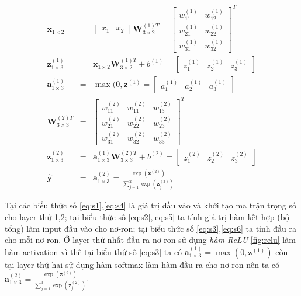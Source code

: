 \begin{eqnarray}
\textbf{x}_{1\times 2} &=&\begin{bmatrix} x_1 &x_2 \end{bmatrix} \textbf{W}^{(1)T}_{3{\times}2}  =\begin{bmatrix}
	w^{(1)}_{11} &w^{(1)}_{12} \\[6pt]
	w^{(1)}_{21} &w^{(1)}_{22} \\[6pt]
	w^{(1)}_{31} &w^{(1)}_{32} 
\end{bmatrix}^{T} \label{eq:s1}\\
\textbf{z}^{(1)}_{1 \times 3} &=&	\textbf{x}_{1\times 2}\textbf{W}^{(1)T}_{3\times 2} +b^{(1)}	= \begin{bmatrix}
z^{(1)}_{1} &z^{(1)}_{2} &z^{(1)}_{3} 
\end{bmatrix} \label{eq:s2}	\\
\label{eq:s3}
\textbf{a}^{(1)}_{1 \times 3}	&=&		\max(0,\textbf{z}^{(1)} =	\begin{bmatrix}
	a^{(1)}_1 &a^{(1)}_2 &a^{(1)}_3 
	\end{bmatrix}\\
\label{eq:s4}
\textbf{W}^{(2)T}_{3{\times}3}  &=&	 \begin{bmatrix}
	w^{(2)}_{11} &w^{(2)}_{11} & w^{(2)}_{13}\\[6pt]
	w^{(2)}_{21} &w^{(2)}_{22} & w^{(2)}_{23}\\[6pt]
	w^{(2)}_{31} &w^{(2)}_{32} & w^{(2)}_{33}
\end{bmatrix}^T  \\
\label{eq:s5}
\textbf{z}^{(2)}_{1\times 3}	&=&\textbf{a}^{(1)}_{1 \times 3}\textbf{W}^{(2)T}_{3{{\times}}3}+b^{(2)}	= \begin{bmatrix}
z^{(2)}_{1} &z^{(2)}_{2} &z^{(2)}_{3} 
\end{bmatrix}\\
\label{eq:s6}
\widehat{\textbf{y}}&=&\textbf{a}^{(2)}_{1\times 3} 	= \frac{\exp({\textbf{z}^{(2)}})}{\sum^{2}_{j=1}{\exp({\textbf{z}^{(3)}_j})}}
\end{eqnarray}


Tại các biểu thức số \ref{eq:s1},\ref{eq:s4} là giá trị đầu vào và khởi tạo ma trận trọng số cho layer thứ 1,2; tại biểu thức số \ref{eq:s2},\ref{eq:s5} ta tính giá trị hàm kết hợp (bộ tổng) làm input đầu vào cho nơ-ron; tại biểu thức số \ref{eq:s3},\ref{eq:s6} ta tính đầu ra cho mỗi nơ-ron. Ở layer thứ nhất đầu ra nơ-ron sử dụng \textit{hàm ReLU} \ref{fig:relu} làm hàm activation vì thế tại biểu thứ số \ref{eq:s3} ta có  $\textbf{a}^{(1)}_{1 \times 3}	=\max(0,\textbf{z}^{(1)})$ còn tại layer thứ hai sử dụng hàm softmax làm hàm đầu ra cho nơ-ron nên ta có $\textbf{a}^{(2)}_{1\times 3} = \frac{\exp({\textbf{z}^{(2)}})}{\sum^{3}_{j=1}{\exp({\textbf{z}^{(2)}_j})}}$.



